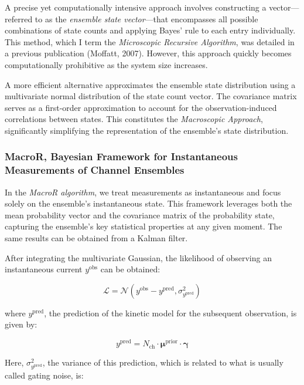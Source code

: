 \documentclass[pdflatex,sn-mathphys-num]{sn-jnl}%
\theoremstyle{thmstyleone}%
\theoremstyle{thmstyletwo}%
\theoremstyle{thmstylethree}%
\begin{document}
A precise yet computationally intensive approach involves constructing a vector—referred to as the \textit{ensemble state vector}—that encompasses all possible combinations of state counts and applying Bayes' rule to each entry individually. This method, which I term the \textit{Microscopic Recursive Algorithm}, was detailed in a previous publication (Moffatt, 2007). However, this approach quickly becomes computationally prohibitive as the system size increases.

A more efficient alternative approximates the ensemble state distribution using a multivariate normal distribution of the state count vector. The covariance matrix serves as a first-order approximation to account for the observation-induced correlations between states. This constitutes the \textit{Macroscopic Approach}, significantly simplifying the representation of the ensemble's state distribution.

\subsubsection{MacroR, Bayesian Framework for Instantaneous Measurements of Channel Ensembles}

In the \textit{MacroR algorithm}, we treat measurements as instantaneous and focus solely on the ensemble's instantaneous state. This framework leverages both the mean probability vector and the covariance matrix of the probability state, capturing the ensemble's key statistical properties at any given moment. The same results can be obtained from a Kalman filter. 

After integrating the multivariate Gaussian, the likelihood of observing an instantaneous current \( y^{\text{obs}} \) can be obtained:

\begin{equation}
	\mathcal{L} = \mathcal{N} \left( y^{\text{obs}} - y^{\text{pred}}, \sigma^2_{y^{\text{pred}}} \right)
	\label{eq:macro_likelihood}
\end{equation}

where \( y^{\text{pred}} \), the prediction of the kinetic model for the subsequent observation, is given by:

\begin{equation}
	y^{\text{pred}} = N_{\text{ch}} \cdot \boldsymbol{\mu}^{\text{prior}} \cdot \boldsymbol{\gamma}
	\label{eq:macro_predicted_y}
\end{equation}

Here, \( \sigma^2_{y^{\text{pred}}} \), the variance of this prediction, which is related to what is usually called gating noise, is:
\end{document}
